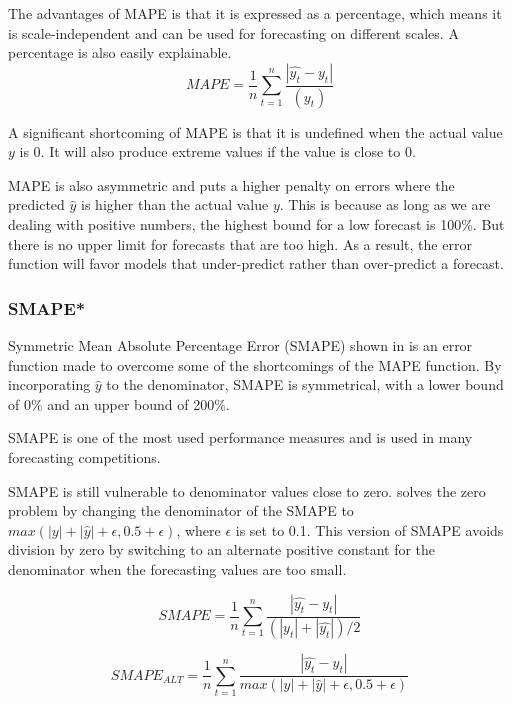 The advantages of MAPE is that it is expressed as a percentage, which means
it is scale-independent and can be used for forecasting on different scales.
A percentage is also easily explainable.
\begin{equation}
  \label{eq:Mape}
  MAPE = \frac{1}{n} \sum_{t=1}^n \frac{|\hat{y_t} - y_t|}{(y_t)}
\end{equation}

A significant shortcoming of MAPE is that it is undefined when the actual value $y$ is 0.
It will also produce extreme values if the value is close to 0.

MAPE is also asymmetric and puts a higher penalty on errors where the predicted
$\hat{y}$ is higher than the actual value $y$.
This is because as long as we are dealing with positive numbers,
the highest bound for a low forecast is 100\%. But there is no upper limit
for forecasts that are too high. As a result, the error function will
favor models that under-predict rather than over-predict a forecast.

\subsubsection{SMAPE*}
Symmetric Mean Absolute Percentage Error (SMAPE) shown in 
is an error function made to overcome some of the shortcomings of the MAPE function.
By incorporating $\hat{y}$ to the denominator, SMAPE is symmetrical,
with a lower bound of 0\% and an upper bound of 200\%.

SMAPE is one of the most used performance measures and is used in many forecasting competitions.

SMAPE is still vulnerable to denominator values close to zero.
\cite{Hewamalage2021} solves the zero problem by changing the denominator
of the SMAPE to $max(|y| + |\hat{y}| + \epsilon, 0.5 + \epsilon)$, where $\epsilon$
is set to 0.1.
This version of SMAPE avoids division by zero by switching to an alternate positive
constant for the denominator when the forecasting values are too small.


\begin{equation}
  \label{eq:sMape}
  SMAPE = \frac{1}{n} \sum_{t=1}^n \frac{|\hat{y_t} - y_t|}{(|y_t| + |\hat{y_t}|) / 2}
\end{equation}

\begin{equation}
  \label{eq:sMape-zero-division-alt}
  SMAPE_{ALT} = \frac{1}{n} \sum_{t=1}^n \frac{|\hat{y_t} - y_t|}{max(|y| + |\hat{y}| + \epsilon, 0.5 + \epsilon)}
\end{equation}



